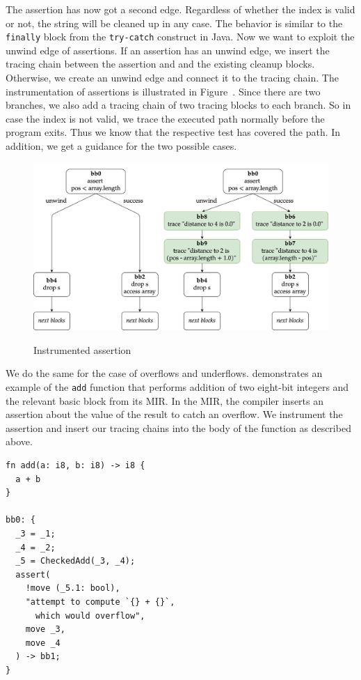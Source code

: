 \documentclass[paper=a4,%
  twoside,%
  BCOR4mm,%
  abstract=true,%
  toc=bibliography,%
  chapterprefix=true,%
  toc=bibliographynumbered,%
  open=right,%
  english,%
  pagesize=pdftex]{scrreprt}
\newcommand{\mir}{\ac{MIR}\xspace}
\begin{document}
The assertion has now got a second edge. Regardless of whether the index is valid or not, the string will be cleaned up in any case. The behavior is similar to the \texttt{finally} block from the \texttt{try-catch} construct in Java. Now we want to exploit the unwind edge of assertions. If an assertion has an unwind edge, we insert the tracing chain between the assertion and and the existing cleanup blocks. Otherwise, we create an unwind edge and connect it to the tracing chain. The instrumentation of assertions is illustrated in Figure~. Since there are two branches, we also add a tracing chain of two tracing blocks to each branch. So in case the index is not valid, we trace the executed path normally before the program exits. Thus we know that the respective test has covered the path. In addition, we get a guidance for the two possible cases.

\begin{figure}[h]
\caption{Instrumented assertion}
\centering
\includegraphics[width=\textwidth]{comparison-instrumented-assertion}
\label{fig:comparison-instrumented-assertion}
\end{figure}

We do the same for the case of overflows and underflows.  demonstrates an example of the \texttt{add} function that performs addition of two eight-bit integers and the relevant basic block from its \mir. In the \mir, the compiler inserts an assertion about the value of the result to catch an overflow. We instrument the assertion and insert our tracing chains into the body of the function as described above.
\begin{lstlisting}[language={}, style=boxed, caption={\mir overflow check}, label=lst:mir-overflow-check]
fn add(a: i8, b: i8) -> i8 {
  a + b
}

bb0: {
  _3 = _1;
  _4 = _2;
  _5 = CheckedAdd(_3, _4);
  assert(
    !move (_5.1: bool),
    "attempt to compute `{} + {}`,
      which would overflow",
    move _3,
    move _4
  ) -> bb1;
}
\end{lstlisting}
\end{document}
